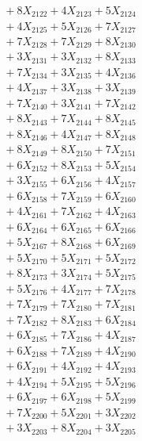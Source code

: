 \documentclass[a4paper,10pt]{article}
\begin{document}
{\begin{align}
&\;  + 8 X_{2122} + 4 X_{2123} + 5 X_{2124} \\[0.3ex]
&\;  + 4 X_{2125} + 5 X_{2126} + 7 X_{2127} \\[0.3ex]
&\;  + 7 X_{2128} + 7 X_{2129} + 8 X_{2130} \\[0.3ex]
&\;  + 3 X_{2131} + 3 X_{2132} + 8 X_{2133} \\[0.3ex]
&\;  + 7 X_{2134} + 3 X_{2135} + 4 X_{2136} \\[0.3ex]
&\;  + 4 X_{2137} + 3 X_{2138} + 3 X_{2139} \\[0.5ex]\allowbreak
&\;  + 7 X_{2140} + 3 X_{2141} + 7 X_{2142} \\[0.3ex]
&\;  + 8 X_{2143} + 7 X_{2144} + 8 X_{2145} \\[0.3ex]
&\;  + 8 X_{2146} + 4 X_{2147} + 8 X_{2148} \\[0.3ex]
&\;  + 8 X_{2149} + 8 X_{2150} + 7 X_{2151} \\[0.3ex]
&\;  + 6 X_{2152} + 8 X_{2153} + 5 X_{2154} \\[0.3ex]
&\;  + 3 X_{2155} + 6 X_{2156} + 4 X_{2157} \\[0.3ex]
&\;  + 6 X_{2158} + 7 X_{2159} + 6 X_{2160} \\[0.3ex]
&\;  + 4 X_{2161} + 7 X_{2162} + 4 X_{2163} \\[0.3ex]
&\;  + 6 X_{2164} + 6 X_{2165} + 6 X_{2166} \\[0.3ex]
&\;  + 5 X_{2167} + 8 X_{2168} + 6 X_{2169} \\[0.5ex]\allowbreak
&\;  + 5 X_{2170} + 5 X_{2171} + 5 X_{2172} \\[0.3ex]
&\;  + 8 X_{2173} + 3 X_{2174} + 5 X_{2175} \\[0.3ex]
&\;  + 5 X_{2176} + 4 X_{2177} + 7 X_{2178} \\[0.3ex]
&\;  + 7 X_{2179} + 7 X_{2180} + 7 X_{2181} \\[0.3ex]
&\;  + 7 X_{2182} + 8 X_{2183} + 6 X_{2184} \\[0.3ex]
&\;  + 6 X_{2185} + 7 X_{2186} + 4 X_{2187} \\[0.3ex]
&\;  + 6 X_{2188} + 7 X_{2189} + 4 X_{2190} \\[0.3ex]
&\;  + 6 X_{2191} + 4 X_{2192} + 4 X_{2193} \\[0.3ex]
&\;  + 4 X_{2194} + 5 X_{2195} + 5 X_{2196} \\[0.3ex]
&\;  + 6 X_{2197} + 6 X_{2198} + 5 X_{2199} \\[0.5ex]\allowbreak
&\;  + 7 X_{2200} + 5 X_{2201} + 3 X_{2202} \\[0.3ex]
&\;  + 3 X_{2203} + 8 X_{2204} + 3 X_{2205} \\[0.3ex]

\end{align}}
\end{document}
